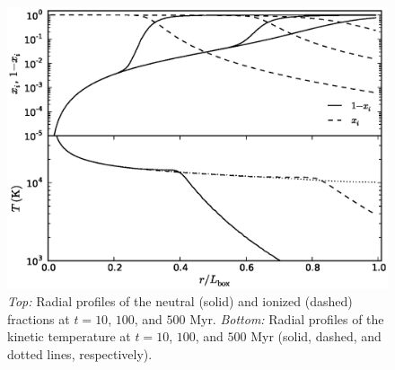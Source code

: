 \documentclass[preprint2]{aastex}              %
\begin{document}
\begin{figure}[htbp]
\begin{center}
\includegraphics[scale=0.4]{figures/RT_Test2_RadialProfiles.ps}
\vspace{-20pt}
\caption{\textit{Top:} Radial profiles of the neutral (solid) and ionized (dashed) fractions at $t = 10$, $100$, and $500$ Myr. \textit{Bottom:} Radial profiles of the kinetic temperature at $t = 10$, $100$, and $500$ Myr (solid, dashed, and dotted lines, respectively).}
\label{fig:RT_Test2_RadialProfiles}
\end{center}
\end{figure}
\end{document}
